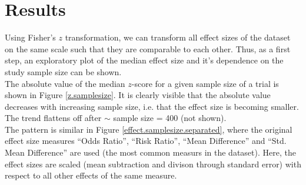 \documentclass[11pt,a4paper,twoside]{book}\usepackage[]{graphicx}\usepackage[]{color}
\begin{document}





































\chapter{Results} \label{ch:Results}





Using Fisher's $z$ transformation, we can transform all effect sizes of the dataset on the same scale such that they are comparable to each other. Thus, as a first step, an exploratory plot of the median effect size and it's dependence on the study sample size can be shown. \\
The absolute value of the median $z$-score for a given sample size of a trial is shown in Figure \ref{z.samplesize}. It is clearly visible that the absolute value decreases with increasing sample size, i.e. that the effect size is becoming smaller. The trend flattens off after $\sim$ sample size = 400 (not shown). \\
The pattern is similar in Figure \ref{effect.samplesize.separated}, where the original effect size measures ``Odds Ratio'', ``Risk Ratio'', ``Mean Difference'' and ``Std. Mean Difference'' are used (the most common measurs in the dataset). Here, the effect sizes are scaled (mean subtraction and divison through standard error) with respect to all other effects of the same measure. 
\end{document}
